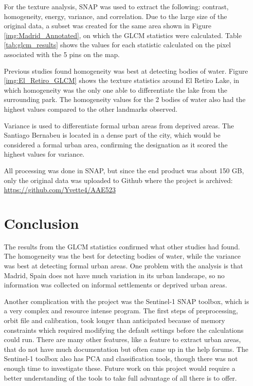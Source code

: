 \documentclass[conference]{IEEEtran}
\begin{document}
	For the texture analysis, SNAP was used to extract the following: contrast, homogeneity, energy, variance, and correlation.
	Due to the large size of the original data, a subset was created for the same area shown in Figure \ref{img:Madrid_Annotated}, on which the GLCM statistics were calculated.
	Table \ref{tab:glcm_results} shows the values for each statistic calculated on the pixel associated with the 5 pins on the map.
	
	Previous studies \cite{Zheng_2004} found homogeneity was best at detecting bodies of water.
	Figure \ref{img:El_Retiro_GLCM} shows the texture statistics around El Retiro Lake, in which homogeneity was the only one able to differentiate the lake from the surrounding park.
	The homogeneity values for the 2 bodies of water also had the highest values compared to the other landmarks observed.
	
	Variance is used to differentiate formal urban areas from deprived areas.
	The Santiago Bernabeu is located in a dense part of the city, which would be considered a formal urban area, confirming the designation as it scored the highest values for variance.
	
	All processing was done in SNAP, but since the end product was about 150 GB, only the original data was uploaded to Github where the project is archived: \url{https://github.com/Yvette4/AAE523}


	\section{Conclusion}
	The results from the GLCM statistics confirmed what other studies had found.
	The homogeneity was the best for detecting bodies of water, while the variance was best at detecting formal urban areas.
	One problem with the analysis is that Madrid, Spain does not have much variation in its urban landscape, so no information was collected on informal settlements or deprived urban areas.

	Another complication with the project was the Sentinel-1 SNAP toolbox, which is a very complex and resource intense program.
	The first steps of preprocessing, orbit file and calibration, took longer than anticipated because of memory constraints which required modifying the default settings before the calculations could run.
	There are many other features, like a feature to extract urban areas, that do not have much documentation but often came up in the help forums.
	The Sentinel-1 toolbox also has PCA and classification tools, though there was not enough time to investigate these.
	Future work on this project would require a better understanding of the tools to take full advantage of all there is to offer.
	
\end{document}
